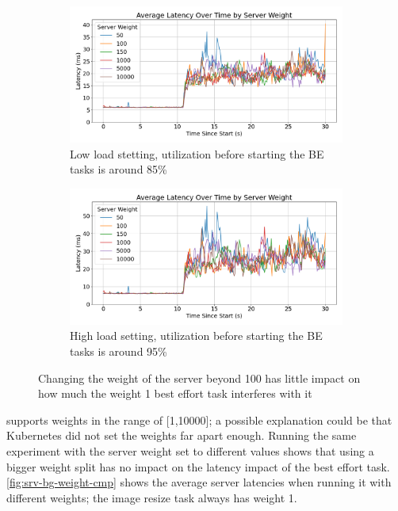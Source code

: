 \begin{figure}[t]
    \centering
    \begin{subfigure}{\columnwidth}
        \includegraphics[width=\columnwidth]{graphs/srv-bg-weight-cmp-low.png}
        \caption{Low load stetting, utilization before starting the BE tasks is
        around 85\%}\label{fig:srv-bg-weight-cmp-low}
        \vspace{12pt}
    \end{subfigure}
    \hspace{\fill}
    \begin{subfigure}{\columnwidth}
        \includegraphics[width=\columnwidth]{graphs/srv-bg-weight-cmp-high.png}
        \caption{High load setting, utilization before starting the BE tasks is
        around 95\%}\label{fig:srv-bg-weight-cmp-high}
    \end{subfigure}
    \vspace{4pt}
    \caption{Changing the weight of the server beyond 100 has little impact on
    how much the weight 1 best effort task interferes with it}\label{fig:srv-bg-weight-cmp}
\end{figure}

\cgroups{} supports weights in the range of [1,10000]; a possible explanation
could be that Kubernetes did not set the weights far apart enough. Running the
same experiment with the server weight set to different values shows that using
a bigger weight split has no impact on the latency impact of the best effort
task. \autoref{fig:srv-bg-weight-cmp} shows the average server latencies when
running it with different weights; the image resize task always has weight 1.

